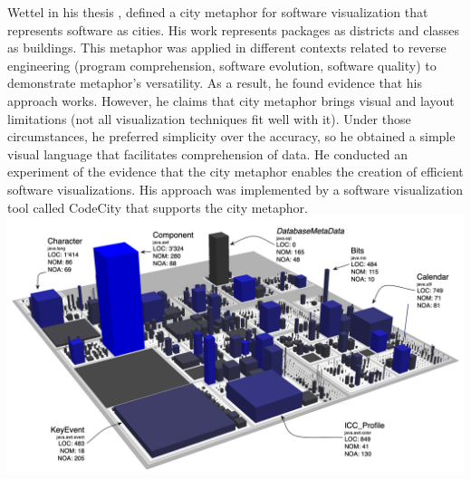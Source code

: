 Wettel in his thesis \cite{Wettel2011}, defined a city metaphor for software visualization that represents software as cities. His work represents packages as districts and classes as buildings. This metaphor was applied in different contexts related to reverse engineering (program comprehension, software evolution, software quality) to demonstrate metaphor's versatility. As a result, he found evidence that his approach works. However, he claims that city metaphor brings visual and layout limitations (not all visualization techniques fit well with it). Under those circumstances, he preferred simplicity over the accuracy, so he obtained a simple visual language that facilitates comprehension of data. He conducted an experiment of the evidence that the city metaphor enables the creation of efficient software visualizations. His approach was implemented by a software visualization tool called CodeCity that supports the city metaphor. 
\\
\includegraphics[width=\textwidth]{CodeCity.png}